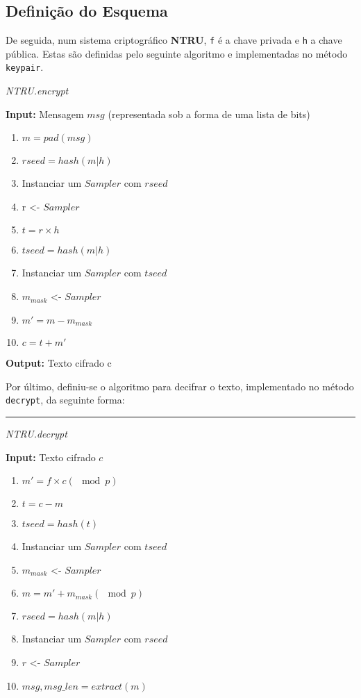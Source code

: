 \documentclass[11pt]{article}
\providecommand{\tightlist}{%
      \setlength{\itemsep}{0pt}\setlength{\parskip}{0pt}}
\begin{document}
    \hypertarget{definiuxe7uxe3o-do-esquema}{%
\subsection{Definição do Esquema}\label{definiuxe7uxe3o-do-esquema}}

    De seguida, num sistema criptográfico \textbf{NTRU}, \texttt{f} é a
chave privada e \texttt{h} a chave pública. Estas são definidas pelo
seguinte algoritmo e implementadas no método \texttt{keypair}.

\emph{NTRU.encrypt}

\textbf{Input:} Mensagem \(msg\) (representada sob a forma de uma lista
de bits)

\begin{enumerate}
\def\labelenumi{\arabic{enumi}.}
\tightlist
\item
  \(m = pad(msg)\)
\item
  \(rseed = hash(m|h)\)
\item
  Instanciar um \(Sampler\) com \(rseed\)
\item
  r \textless- \(Sampler\)
\item
  \(t = r \times h\)
\item
  \(tseed = hash(m|h)\)
\item
  Instanciar um \(Sampler\) com \(tseed\)
\item
  \(m_{mask}\) \textless- \(Sampler\)
\item
  \(m' = m - m_{mask}\)
\item
  \(c = t + m'\)
\end{enumerate}

\textbf{Output:} Texto cifrado c

Por último, definiu-se o algoritmo para decifrar o texto, implementado
no método \texttt{decrypt}, da seguinte forma:

\begin{center}\rule{0.5\linewidth}{\linethickness}\end{center}

\emph{NTRU.decrypt}

\textbf{Input:} Texto cifrado \(c\)

\begin{enumerate}
\def\labelenumi{\arabic{enumi}.}
\tightlist
\item
  \(m' = f \times c (\mod p)\)
\item
  \(t = c- m\)
\item
  \(tseed = hash(t)\)
\item
  Instanciar um \(Sampler\) com \(tseed\)
\item
  \(m_{mask}\) \textless- \(Sampler\)
\item
  \(m = m' + m_{mask} (\mod p)\)
\item
  \(rseed = hash(m|h)\)
\item
  Instanciar um \(Sampler\) com \(rseed\)
\item
  \(r\) \textless- \(Sampler\)
\item
  \(msg,msg\_len = extract(m)\)
\end{enumerate}
\end{document}
